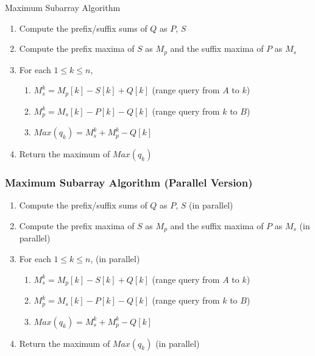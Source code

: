 \documentclass{beamer}
\begin{document}
\begin{frame}{Maximum Subarray Algorithm}
\begin{enumerate}
  \item Compute the prefix/suffix sums of $Q$ as $P$, $S$
  \item Compute the prefix maxima of $S$ as $M_p$ and the suffix maxima of $P$ as $M_s$
  \item For each $1 \leq k \leq n$, \begin{enumerate}
    \item $M_s^k = M_p[k] - S[k] + Q[k]$ (range query from $A$ to $k$)
    \item $M_p^k = M_s[k] - P[k] - Q[k]$ (range query from $k$ to $B$)
    \item $Max(q_k) = M_s^k + M_p^k - Q[k]$
  \end{enumerate}
  \item Return the maximum of $Max(q_k)$
\end{enumerate}
\end{frame}

\beamerdefaultoverlayspecification{<*>}

\begin{frame}[<*>]
  \frametitle{Maximum Subarray Algorithm (Parallel Version)}
  \begin{enumerate}
    \item Compute the prefix/suffix sums of $Q$ as $P$, $S$ \alert{(in parallel)}
    \item Compute the prefix maxima of $S$ as $M_p$ and the suffix maxima of $P$ as $M_s$ \alert{(in parallel)}
    \item For each $1 \leq k \leq n$, \alert{(in parallel)} \begin{enumerate}
      \item $M_s^k = M_p[k] - S[k] + Q[k]$ (range query from $A$ to $k$)
      \item $M_p^k = M_s[k] - P[k] - Q[k]$ (range query from $k$ to $B$)
      \item $Max(q_k) = M_s^k + M_p^k - Q[k]$
    \end{enumerate}
    \item Return the maximum of $Max(q_k)$ \alert{(in parallel)}
  \end{enumerate}
\end{frame}
\end{document}
